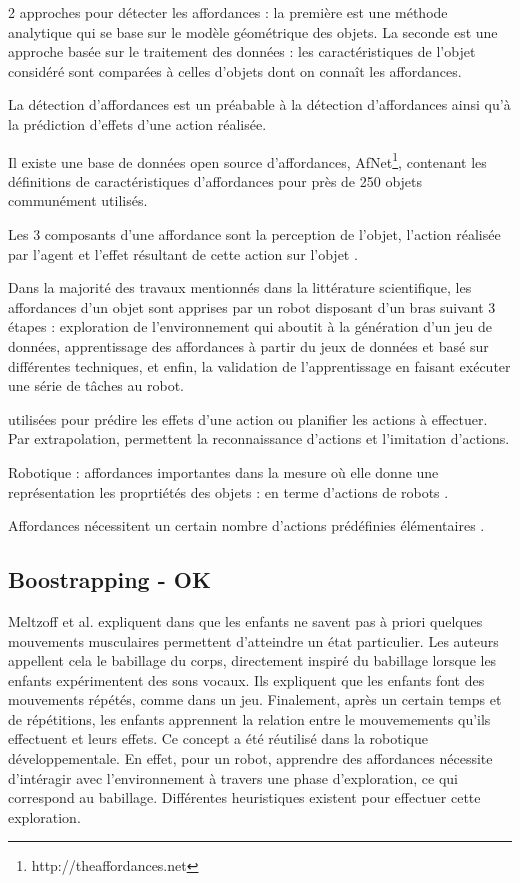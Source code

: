 \documentclass[draft]{llncs}
\begin{document}
2 approches pour détecter les affordances : la première est une méthode analytique qui se base sur le modèle géométrique des objets.
La seconde est une approche basée sur le traitement des données : les caractéristiques de l'objet considéré sont comparées à celles d'objets dont on connaît les affordances.

La détection d'affordances est un préabable à la détection d'affordances \cite{Jamone2016} ainsi qu'à la prédiction d'effets d'une action réalisée.

Il existe une base de données open source d'affordances, AfNet\footnote{http://theaffordances.net}, contenant les définitions de caractéristiques d'affordances pour près de 250 objets communément utilisés. 

Les 3 composants d'une affordance sont la perception de l'objet, l'action réalisée par l'agent et l'effet résultant de cette action sur l'objet \cite{Sahin2007}.

Dans la majorité des travaux mentionnés dans la littérature scientifique, les affordances d'un objet sont apprises par un robot disposant d'un bras suivant 3 étapes : exploration de l'environnement qui aboutit à la génération d'un jeu de données, apprentissage des affordances à partir du jeux de données et basé sur différentes techniques, et enfin, la validation de l'apprentissage en faisant exécuter une série de tâches au robot.

utilisées pour prédire les effets d'une action ou planifier les actions à effectuer.
Par extrapolation, permettent la reconnaissance d'actions et l'imitation d'actions.

Robotique : affordances importantes dans la mesure où elle donne une représentation les proprtiétés des objets : en terme d'actions de robots \cite{Montesano2008}. 

Affordances nécessitent un certain nombre d'actions prédéfinies élémentaires \cite{Montesano2008}.




\subsection{Boostrapping - OK}

Meltzoff et al. expliquent dans \cite{EDP:EDP157} que les enfants ne savent pas à priori quelques mouvements musculaires permettent d'atteindre un état particulier.
Les auteurs appellent cela le babillage du corps, directement inspiré du babillage lorsque les enfants expérimentent des sons vocaux.
Ils expliquent que les enfants font des mouvements répétés, comme dans un jeu.
Finalement, après un certain temps et de répétitions, les enfants apprennent la relation entre le mouvemements qu'ils effectuent et leurs effets.
Ce concept a été réutilisé dans la robotique développementale.
En effet, pour un robot, apprendre des affordances nécessite d'intéragir avec l'environnement à travers une phase d'exploration, ce qui correspond au babillage. Différentes heuristiques existent pour effectuer cette exploration.
\end{document}
